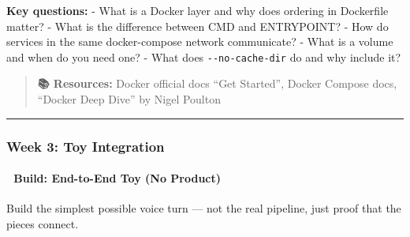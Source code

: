 \documentclass[
  11pt,
]{article}
\newcommand{\passthrough}[1]{#1}
\begin{document}
\textbf{Key questions:} - What is a Docker layer and why does ordering
in Dockerfile matter? - What is the difference between CMD and
ENTRYPOINT? - How do services in the same docker-compose network
communicate? - What is a volume and when do you need one? - What does
\passthrough{\lstinline!--no-cache-dir!} do and why include it?

\begin{quote}
\textbf{📚 Resources:} Docker official docs ``Get Started'', Docker
Compose docs, ``Docker Deep Dive'' by Nigel Poulton
\end{quote}

\begin{center}\rule{0.5\linewidth}{0.5pt}\end{center}

\hypertarget{week-3-toy-integration}{%
\subsubsection{Week 3: Toy Integration}\label{week-3-toy-integration}}

\hypertarget{build-end-to-end-toy-no-product}{%
\paragraph{🔨 Build: End-to-End Toy (No
Product)}\label{build-end-to-end-toy-no-product}}

Build the simplest possible voice turn --- not the real pipeline, just
proof that the pieces connect.
\end{document}
